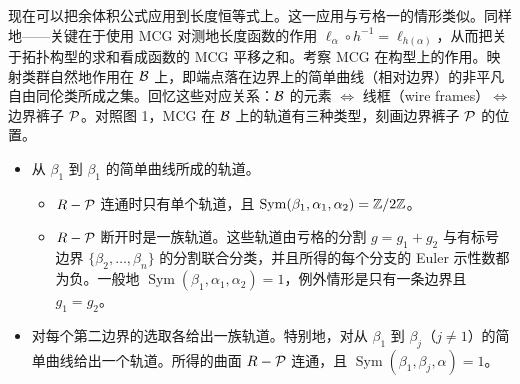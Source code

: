
现在可以把余体积公式应用到长度恒等式上。这一应用与亏格一的情形类似。同样地——关键在于使用 MCG 对测地长度函数的作用 $\ell_\alpha\circ h^{-1}=\ell_{h(\alpha)}$，从而把关于拓扑构型的求和看成函数的 MCG 平移之和。考察 MCG 在构型上的作用。映射类群自然地作用在 $\mathcal{B}$ 上，即端点落在边界上的简单曲线（相对边界）的非平凡自由同伦类所成之集。回忆这些对应关系：$\mathcal{B}$ 的元素 $\iff$ 线框（wire frames）$\iff$ 边界裤子 $\mathcal{P}$。对照图 1，MCG 在 $\mathcal{B}$ 上的轨道有三种类型，刻画边界裤子 $\mathcal{P}$ 的位置。
\begin{itemize}[leftmargin=1.6em,itemsep=2pt,topsep=2pt]
\item 从 $\beta_1$ 到 $\beta_1$ 的简单曲线所成的轨道。
  \begin{itemize}[leftmargin=1.4em,itemsep=2pt,topsep=2pt]
  \item $R-\mathcal{P}$ 连通时只有单个轨道，且 $\operatorname{Sym}(\beta_1,\alpha_1,\alpha_2)=\mathbb{Z}/2\mathbb{Z}$。
  \item $R-\mathcal{P}$ 断开时是一族轨道。这些轨道由亏格的分割 $g=g_1+g_2$ 与有标号边界 $\{\beta_2,\ldots,\beta_n\}$ 的分割联合分类，并且所得的每个分支的 Euler 示性数都为负。一般地 $\operatorname{Sym}(\beta_1,\alpha_1,\alpha_2)=1$，例外情形是只有一条边界且 $g_1=g_2$。
  \end{itemize}
\item 对每个第二边界的选取各给出一族轨道。特别地，对从 $\beta_1$ 到 $\beta_j$（$j\neq1$）的简单曲线给出一个轨道。所得的曲面 $R-\mathcal{P}$ 连通，且 $\operatorname{Sym}(\beta_1,\beta_j,\alpha)=1$。
\end{itemize}

